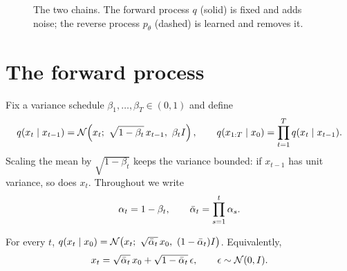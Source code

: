 \begin{figure}[t]
  \centering
  \caption{The two chains. The forward process $q$ (solid) is fixed and adds noise; the reverse process $p_\theta$ (dashed) is learned and removes it.}\label{fig:chain}
\end{figure}

\section{The forward process}\label{sec:forward}
Fix a variance schedule $\beta_1, \dots, \beta_T \in (0, 1)$ and define
\begin{equation}\label{eq:forward-step}
  q(x_t \mid x_{t-1}) = \N\!\left(x_t;\ \sqrt{1-\beta_t}\,x_{t-1},\ \beta_t I\right),
  \qquad q(x_{1:T} \mid x_0) = \prod_{t=1}^{T} q(x_t \mid x_{t-1}).
\end{equation}
Scaling the mean by $\sqrt{1-\beta_t}$ keeps the variance bounded: if $x_{t-1}$ has unit variance, so does $x_t$.
Throughout we write
\begin{equation}\label{eq:alphas}
  \alpha_t = 1 - \beta_t, \qquad \bar\alpha_t = \prod_{s=1}^{t} \alpha_s .
\end{equation}

\begin{proposition}\label{prop:marginal}
For every $t$, $q(x_t \mid x_0) = \N\!\left(x_t;\ \sqrt{\abar_t}\,x_0,\ (1-\abar_t) I\right)$. Equivalently,
\begin{equation}\label{eq:marginal}
  x_t = \sqrt{\bar\alpha_t}\,x_0 + \sqrt{1-\bar\alpha_t}\,\epsilon, \qquad \epsilon \sim \mathcal{N}(0, I).
\end{equation}
\end{proposition}

